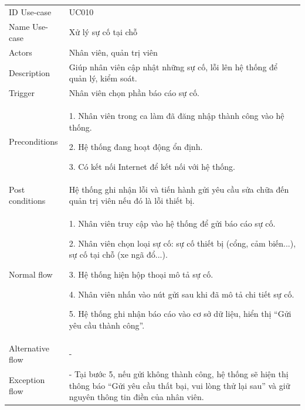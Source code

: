 \begin{center}
    \begin{tabular}{|m{2.5cm}|m{13cm}|}
    \hline
        ID Use-case  & UC010 \\ 
        Name Use-case & Xử lý sự cố tại chỗ \\ 
    \hline
        Actors & Nhân viên, quản trị viên \\
    \hline
        Description & Giúp nhân viên cập nhật những sự cố, lỗi lên hệ thống để quản lý, kiểm soát. \\
    \hline
        Trigger & Nhân viên chọn phần báo cáo sự cố. \\
    \hline
        Preconditions & 
        1. Nhân viên trong ca làm đã đăng nhập thành công vào hệ thống.
        
        2. Hệ thống đang hoạt động ổn định.
        
        3. Có kết nối Internet để kết nối với hệ thống. \\
    \hline
        Post conditions & Hệ thống ghi nhận lỗi và tiến hành gửi yêu cầu sửa chữa đến quản trị viên nếu đó là lỗi thiết bị. \\
    \hline
        Normal flow & 
        1. Nhân viên truy cập vào hệ thống để gửi báo cáo sự cố.
        
        2. Nhân viên chọn loại sự cố: sự cố thiết bị (cổng, cảm biến...), sự cố tại chỗ (xe ngã đổ...).
        
        3. Hệ thống hiện hộp thoại mô tả sự cố.
        
        4. Nhân viên nhấn vào nút gửi sau khi đã mô tả chi tiết sự cố.
        
        5. Hệ thống ghi nhận báo cáo vào cơ sở dữ liệu, hiển thị “Gửi yêu cầu thành công”. \\
    \hline
        Alternative flow & - \\ 
    \hline
        Exception flow & 
        - Tại bước 5, nếu gửi không thành công, hệ thống sẽ hiện thị thông báo “Gửi yêu cầu thất bại, vui lòng thử lại sau” và giữ nguyên thông tin điền của nhân viên. \\ 
    \hline
    \end{tabular}
\end{center}
